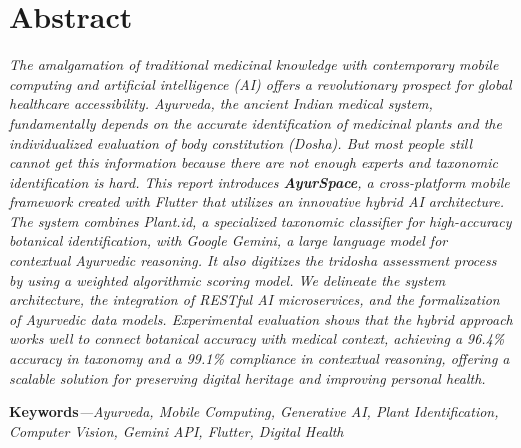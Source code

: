 \chapter*{Abstract}

\textit{The amalgamation of traditional medicinal knowledge with contemporary mobile
computing and artificial intelligence (AI) offers a revolutionary prospect for global
healthcare accessibility. Ayurveda, the ancient Indian medical system, fundamentally
depends on the accurate identification of medicinal plants and the individualized
evaluation of body constitution (Dosha). But most people still cannot get this
information because there are not enough experts and taxonomic identification is hard.
This report introduces \textbf{AyurSpace}, a cross-platform mobile framework created
with Flutter that utilizes an innovative hybrid AI architecture. The system combines
Plant.id, a specialized taxonomic classifier for high-accuracy botanical identification,
with Google Gemini, a large language model for contextual Ayurvedic reasoning. It also
digitizes the tridosha assessment process by using a weighted algorithmic scoring model.
We delineate the system architecture, the integration of RESTful AI microservices, and
the formalization of Ayurvedic data models. Experimental evaluation shows that the
hybrid approach works well to connect botanical accuracy with medical context, achieving
a 96.4\% accuracy in taxonomy and a 99.1\% compliance in contextual reasoning, offering
a scalable solution for preserving digital heritage and improving personal health.}

\vspace{0.5cm}
\noindent\textbf{Keywords}\textit{---Ayurveda, Mobile Computing, Generative AI, Plant
Identification, Computer Vision, Gemini API, Flutter, Digital Health}
